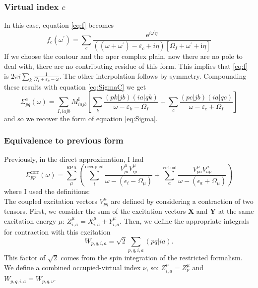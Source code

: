 \documentclass[12pt]{article}
\begin{document}
\subsubsection{Virtual index $c$}
In this case, equation \ref{eq:f} becomes
\begin{equation}
    f_c(\omega ^\prime) = \sum_c\frac{\mathrm{e}^{i \omega^{\prime}\eta}}{\left((\omega + \omega^{\prime}) - \varepsilon_{c} +i\eta\right) \left[\Omega _I + \omega^\prime + \mathrm{i}\eta\right]}
\end{equation}
If we choose the contour and the aper complex plain, now there are no pole to deal with, there are no contributing residue of this form. This implies that \ref{eq:f} is $2\pi i \sum_k \frac{1}{\Omega _I + \varepsilon_{k} - \omega}$. The other interpolation follows by symmetry. Compounding these results with equation \ref{eq:SigmaC} we get
\begin{equation}
    \Sigma _{p q}^c\left(\omega\right) = \sum_{I,iajb} M_{i a j b}^{\mathrm{I}} \left[\sum_k \frac{(p k|jb)(ia|qk)}{\omega - \varepsilon_{k} - \Omega _I} + \sum_c \frac{(p c|jb)(ia|qc)}{\omega - \varepsilon_{c} + \Omega _I}\right]
\end{equation}
and so we recover the form of equation \ref{eq:Sigma}.
\subsubsection{Equivalence to previous form}
Previously, in the direct approximation, I had
\begin{equation}
    \Sigma_{pp}^{\text{corr}}(\omega) = \sum_{\mu }^{\text{RPA}}\left(\sum_{i}^{\text{occupied}} \frac{V_{pi}^{\mu }V_{ip}^{\mu }}{\omega -(\epsilon _{i}-\Omega  _{\mu })}+ \sum_{a}^{\text{virtual}} \frac{V_{pa}^{\mu }V_{ap}^{\mu }}{\omega -(\epsilon _{a}+\Omega  _{\mu })}\right)
\label{eq:SigmaOld}
\end{equation}
where I used the definitions:\\
The coupled excitation vectors $V _{pq}^{\mu }$ are defined 
 by considering a contraction of two tensors. First, we consider the sum of the excitation vectors $\textbf{X}$ and $\textbf{Y}$ at the same excitation energy $\mu$: $Z_{i,a}^{\mu} = X_{i,a}^{\mu} + Y_{i,a}^{\mu}$. Then, we define the appropriate integrals for contraction with this excitation
\begin{equation}
    W_{p,q,i,a} = \sqrt{2} \sum_{p,q,i,a} (pq|ia).
\label{eq:W}
\end{equation}
This factor of $\sqrt{2}$ comes from the spin integration of the restricted formalism.
We define a combined occupied-virtual index $\nu$, so: ${Z}_{i,a}^{\mu} = {Z}_{\nu}^{\mu}$ and ${W}_{p,q,i,a} = {W}_{p,q,\nu}$.
\end{document}
